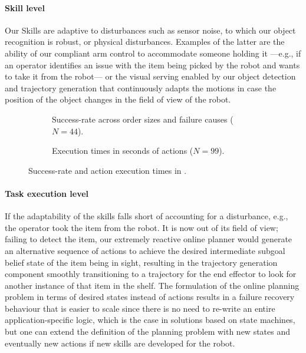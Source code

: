 \paragraph{Skill level} Our Skills are adaptive to disturbances such as sensor noise, to which our object recognition is robust, or physical disturbances. Examples of the latter are the ability of our compliant arm control to accommodate someone holding it ---e.g., if an operator identifies an issue with the item being picked by the robot and wants to take it from the robot--- or the visual serving enabled by our object detection and trajectory generation that continuously adapts the motions in case the position of the object changes in the field of view of the robot.
\begin{figure}[t]
\begin{subfigure}[b]{1\linewidth}
    \centering
    
    \caption{Success-rate across order sizes and failure causes ($N=44$).}
    \label{fig:success_zandam}
  \end{subfigure}
\begin{subfigure}[b]{1\linewidth}
    \centering%
     
    \caption{Execution times in seconds of actions ($N=99$).}
    \label{fig:timings_real}
  \end{subfigure}
  \caption{Success-rate and action execution times in \realsupermarket.}
\end{figure}
\paragraph{Task execution level}
If the adaptability of the skills falls short of accounting for a disturbance, e.g., the operator took the item from the robot. It is now out of its field of view; failing to detect the item, our extremely reactive online planner would generate an alternative sequence of actions to achieve the desired intermediate subgoal belief state of the item being in sight, resulting in the trajectory generation component smoothly transitioning to a trajectory for the end effector to look for another instance of that item in the shelf.
The formulation of the online planning problem in terms of desired states instead of actions results in a failure recovery behaviour that is easier to scale since there is no need to re-write an entire application-specific logic, which is the case in solutions based on state machines, but one can extend the definition of the planning problem with new states and eventually new actions if new skills are developed for the robot.

